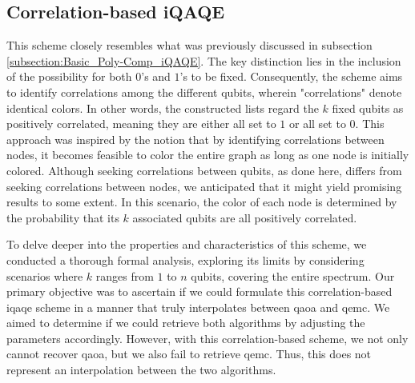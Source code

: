 






\subsection{Correlation-based iQAQE}
\label{subsection:Correlation_iQAQE}

This scheme closely resembles what was previously discussed in subsection \ref{subsection:Basic_Poly-Comp_iQAQE}. The key distinction lies in the inclusion of the possibility for both $0$'s and $1$'s to be fixed. Consequently, the scheme aims to identify correlations among the different qubits, wherein "correlations" denote identical colors. In other words, the constructed lists regard the $k$ fixed qubits as positively correlated, meaning they are either all set to $1$ or all set to $0$. This approach was inspired by the notion that by identifying correlations between nodes, it becomes feasible to color the entire graph as long as one node is initially colored. Although seeking correlations between qubits, as done here, differs from seeking correlations between nodes, we anticipated that it might yield promising results to some extent. In this scenario, the color of each node is determined by the probability that its $k$ associated qubits are all positively correlated.

To delve deeper into the properties and characteristics of this scheme, we conducted a thorough formal analysis, exploring its limits by considering scenarios where $k$ ranges from $1$ to $n$ qubits, covering the entire spectrum. Our primary objective was to ascertain if we could formulate this correlation-based \acrshort{iqaqe} scheme in a manner that truly interpolates between \acrshort{qaoa} and \acrshort{qemc}. We aimed to determine if we could retrieve both algorithms by adjusting the parameters accordingly. However, with this correlation-based scheme, we not only cannot recover \acrshort{qaoa}, but we also fail to retrieve \acrshort{qemc}. Thus, this does not represent an interpolation between the two algorithms.

